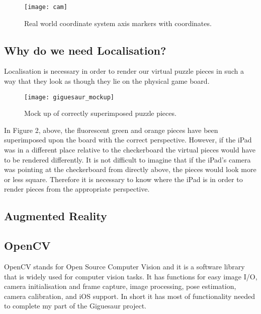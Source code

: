 \documentclass{article}
\begin{document}
\begin{figure}[ht]
\begin{center}
\texttt{[image: cam]} 
\caption{Real world coordinate system axis markers with coordinates.}
\end{center}
\end{figure}

\subsection {Why do we need Localisation?}

Localisation is necessary in order to render our virtual puzzle pieces in such a way that they look as though they lie on the physical game board. 
\vspace*{2\baselineskip}

\begin{figure}[H]
\begin{center}
\texttt{[image: giguesaur\_mockup]} 
\caption{Mock up of correctly superimposed puzzle pieces.}
\end{center}
\end{figure}

In Figure 2, above, the fluorescent green and orange pieces have been superimposed upon the board with the correct perspective. However, if the iPad was in a different place relative to the checkerboard the virtual pieces would have to be rendered differently. It is not difficult to imagine that if the iPad's camera was pointing at the checkerboard from directly above, the pieces would look more or less square. Therefore it is necessary to know where the iPad is in order to render pieces from the appropriate perspective.

\subsection{Augmented Reality}


\subsection{OpenCV}

OpenCV stands for Open Source Computer Vision and it is a software library that is widely used for computer vision tasks. It has functions for easy image I/O, camera initialisation and frame capture, image processing, pose estimation, camera calibration, and iOS support. In short it has most of functionality needed to complete my part of the Giguesaur project.
\end{document}
